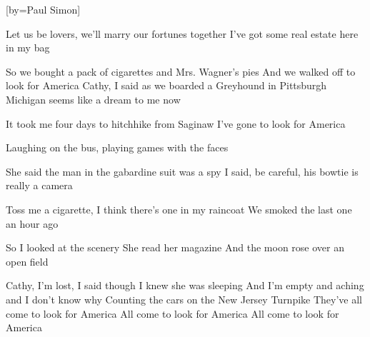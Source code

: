 


[by={Paul Simon}]



\beginverse
Let us be lovers, we'll marry our fortunes together
I've got some real estate here in my bag

So we bought a pack of cigarettes and Mrs. Wagner's pies
And we walked off to look for America
Cathy, I said as we boarded a Greyhound in Pittsburgh
Michigan seems like a dream to me now

It took me four days to hitchhike from Saginaw
I've gone to look for America

Laughing on the bus, playing games with the faces

She said the man in the gabardine suit was a spy
I said, be careful, his bowtie is really a camera

Toss me a cigarette, I think there's one in my raincoat
We smoked the last one an hour ago

So I looked at the scenery
She read her magazine
And the moon rose over an open field
\endverse

\beginverse
Cathy, I'm lost, I said though I knew she was sleeping
And I'm empty and aching and I don't know why
Counting the cars on the New Jersey Turnpike
They've all come to look for America
All come to look for America
All come to look for America
\endverse


\endsong
